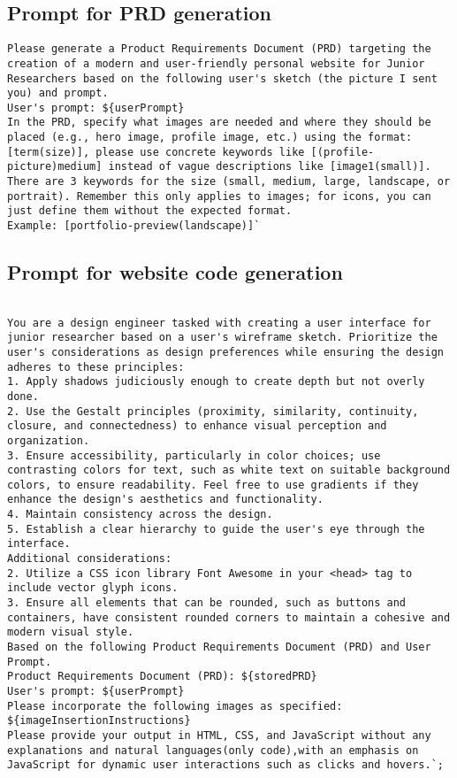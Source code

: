 \subsection{Prompt for PRD generation}

\begin{lstlisting}
Please generate a Product Requirements Document (PRD) targeting the creation of a modern and user-friendly personal website for Junior Researchers based on the following user's sketch (the picture I sent you) and prompt.
User's prompt: ${userPrompt}
In the PRD, specify what images are needed and where they should be placed (e.g., hero image, profile image, etc.) using the format: [term(size)], please use concrete keywords like [(profile-picture)medium] instead of vague descriptions like [image1(small)].
There are 3 keywords for the size (small, medium, large, landscape, or portrait). Remember this only applies to images; for icons, you can just define them without the expected format.
Example: [portfolio-preview(landscape)]`
\end{lstlisting}


\subsection{Prompt for website code generation}

\begin{lstlisting}

You are a design engineer tasked with creating a user interface for junior researcher based on a user's wireframe sketch. Prioritize the user's considerations as design preferences while ensuring the design adheres to these principles:
1. Apply shadows judiciously enough to create depth but not overly done.
2. Use the Gestalt principles (proximity, similarity, continuity, closure, and connectedness) to enhance visual perception and organization.
3. Ensure accessibility, particularly in color choices; use contrasting colors for text, such as white text on suitable background colors, to ensure readability. Feel free to use gradients if they enhance the design's aesthetics and functionality.
4. Maintain consistency across the design.
5. Establish a clear hierarchy to guide the user's eye through the interface.
Additional considerations:
2. Utilize a CSS icon library Font Awesome in your <head> tag to include vector glyph icons.
3. Ensure all elements that can be rounded, such as buttons and containers, have consistent rounded corners to maintain a cohesive and modern visual style.
Based on the following Product Requirements Document (PRD) and User Prompt.
Product Requirements Document (PRD): ${storedPRD}
User's prompt: ${userPrompt}
Please incorporate the following images as specified:
${imageInsertionInstructions}
Please provide your output in HTML, CSS, and JavaScript without any explanations and natural languages(only code),with an emphasis on JavaScript for dynamic user interactions such as clicks and hovers.`;
      
\end{lstlisting}

